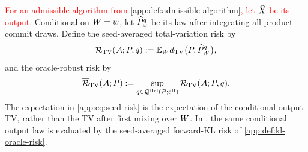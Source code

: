 \begin{definition}[\textcolor{red}{Output law and \HellingerCase\ risk}]
\label{app:def:output-risk}
\textcolor{red}{For an admissible algorithm from
\cref{app:def:admissible-algorithm}, let $\widehat X$ be its output.}
Conditional on $W=w$, let
$\widehat P_{w}^{q}$ be its law after integrating all
product-commit draws.
Define the seed-averaged total-variation risk by
\begin{equation}
 \mathcal R_{\mathrm{TV}}(\mathcal A;P,q)
 :=\mathbb E_{W}
 d_{\mathrm{TV}}\bigl(P,
            \widehat P_{W}^{q}\bigr),
 \label{app:eq:seed-risk}
\end{equation}
and the oracle-robust risk by
\begin{equation}
 \overline{\mathcal R}_{\mathrm{TV}}(\mathcal A;P)
 :=\sup_{q\in\mathcal Q^{\mathrm{Hel}}(P;\varepsilon^{\mathrm H})}
 \mathcal R_{\mathrm{TV}}(\mathcal A;P,q).
 \label{app:eq:robust-risk}
\end{equation}
The expectation in \eqref{app:eq:seed-risk} is the expectation of the
conditional-output TV, rather than the TV after first mixing over
$W$.
In \KLCase, the same conditional output law is evaluated by the
seed-averaged forward-KL risk of \cref{app:def:kl-oracle-risk}.
\end{definition}

